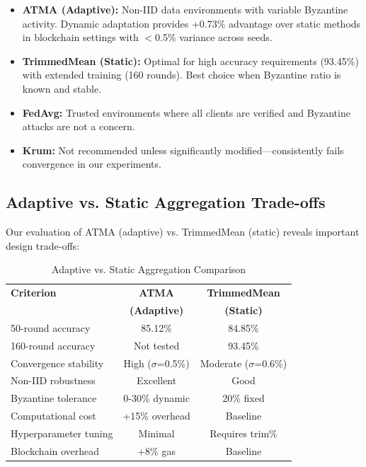\documentclass[12pt,a4paper,onecolumn]{article}
\begin{document}
\begin{itemize}
    \item \textbf{ATMA (Adaptive):} Non-IID data environments with variable Byzantine activity. Dynamic adaptation provides +0.73\% advantage over static methods in blockchain settings with $<$0.5\% variance across seeds.
    
    \item \textbf{TrimmedMean (Static):} Optimal for high accuracy requirements (93.45\%) with extended training (160 rounds). Best choice when Byzantine ratio is known and stable.
    
    \item \textbf{FedAvg:} Trusted environments where all clients are verified and Byzantine attacks are not a concern.
    
    \item \textbf{Krum:} Not recommended unless significantly modified---consistently fails convergence in our experiments.
\end{itemize}

\subsection{Adaptive vs. Static Aggregation Trade-offs}

Our evaluation of ATMA (adaptive) vs. TrimmedMean (static) reveals important design trade-offs:

\begin{table}[t]
\caption{Adaptive vs. Static Aggregation Comparison}
\label{tab:adaptive_static}
\centering
\begin{tabular}{lcc}
\toprule
\textbf{Criterion} & \textbf{ATMA} & \textbf{TrimmedMean} \\
& \textbf{(Adaptive)} & \textbf{(Static)} \\
\midrule
50-round accuracy & 85.12\% & 84.85\% \\
160-round accuracy & Not tested & 93.45\% \\
Convergence stability & High ($\sigma$=0.5\%) & Moderate ($\sigma$=0.6\%) \\
Non-IID robustness & Excellent & Good \\
Byzantine tolerance & 0-30\% dynamic & 20\% fixed \\
Computational cost & +15\% overhead & Baseline \\
Hyperparameter tuning & Minimal & Requires trim\% \\
Blockchain overhead & +8\% gas & Baseline \\
\bottomrule
\end{tabular}
\end{table}
\end{document}
